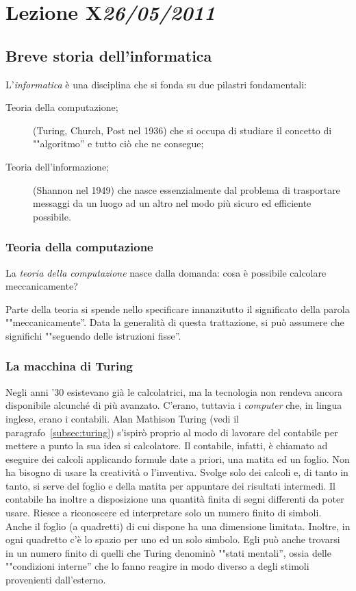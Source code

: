 \chapter[Lezione X]{Lezione X\newline\small{\emph{26/05/2011}}}
	\section{Breve storia dell'informatica}
L'\emph{informatica} è una disciplina che si fonda su due pilastri fondamentali:
\begin{description}
	\item[Teoria della computazione;] (Turing, Church, Post nel 1936) che si occupa di studiare il concetto di ""algoritmo'' e tutto ciò che ne consegue;
	\item[Teoria dell'informazione;] (Shannon nel 1949) che nasce essenzialmente dal problema di trasportare messaggi da un luogo ad un altro nel modo più sicuro ed efficiente possibile.
\end{description}

		\subsection{Teoria della computazione}
La \emph{teoria della computazione} nasce dalla domanda: cosa è possibile calcolare meccanicamente?

Parte della teoria si spende nello specificare innanzitutto il significato della parola ""meccanicamente''. Data la generalità di questa trattazione, si può assumere che significhi ""seguendo delle istruzioni fisse''.

		\subsection{La macchina di Turing}
		\label{subsec:mturing}
Negli anni '30 esistevano già le calcolatrici, ma la tecnologia non rendeva ancora disponibile alcunché di più avanzato. C'erano, tuttavia i \emph{computer} che, in lingua inglese, erano i contabili. Alan Mathison Turing (vedi il paragrafo~\vref{subsec:turing}) s'ispirò proprio al modo di lavorare del contabile per mettere a punto la sua idea si calcolatore. Il contabile, infatti, è chiamato ad eseguire dei calcoli applicando formule date a priori, una matita ed un foglio. Non ha bisogno di usare la creatività o l'inventiva. Svolge solo dei calcoli e, di tanto in tanto, si serve del foglio e della matita per appuntare dei risultati intermedi. Il contabile ha inoltre a disposizione una quantità finita di segni differenti da poter usare. Riesce a riconoscere ed interpretare solo un numero finito di simboli. Anche il foglio (a quadretti) di cui dispone ha una dimensione limitata. Inoltre, in ogni quadretto c'è lo spazio per uno ed un solo simbolo. Egli può anche trovarsi in un numero finito di quelli che Turing denominò ""stati mentali'', ossia delle ""condizioni interne'' che lo fanno reagire in modo diverso a degli stimoli provenienti dall'esterno.

